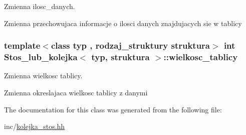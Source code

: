 Zmienna ilosc\+\_\+danych. 

Zmienna przechowujaca informacje o ilosci danych znajdujacych sie w tablicy \hypertarget{class_stos__lub__kolejka_a73d579d36148bb5047d5d6693aa69b57}{
\subsubsection[{wielkosc\+\_\+tablicy}]{\setlength{\rightskip}{0pt plus 5cm}template$<$class typ , rodzaj\+\_\+struktury struktura$>$ int {\bf Stos\+\_\+lub\+\_\+kolejka}$<$ typ, struktura $>$\+::wielkosc\+\_\+tablicy}}\label{class_stos__lub__kolejka_a73d579d36148bb5047d5d6693aa69b57}


Zmienna wielkosc tablicy. 

Zmienna okreslajaca wielkosc tablicy z danymi 

The documentation for this class was generated from the following file\+:\begin{DoxyCompactItemize}
\item 
inc/\hyperlink{kolejka__stos_8hh}{kolejka\+\_\+stos.\+hh}\end{DoxyCompactItemize}
